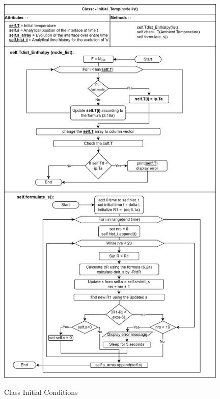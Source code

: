 \begin{figure}[htb]
  \centering
  \includegraphics[width=11cm]{img/drawio.png}\\
  \caption{Class Initial Conditions}
  \label{fig:Initial Conditions}
\end{figure}

